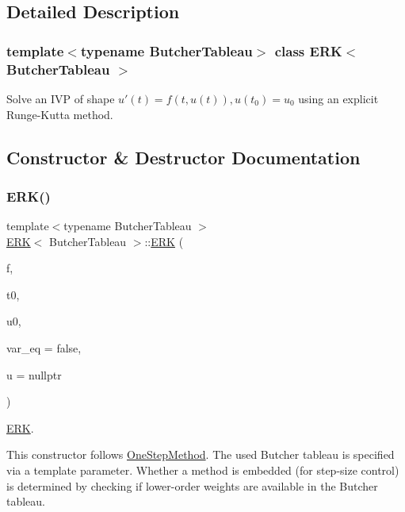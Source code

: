 \subsection{Detailed Description}
\subsubsection*{template$<$typename Butcher\+Tableau$>$\newline
class E\+R\+K$<$ Butcher\+Tableau $>$}

Solve an I\+VP of shape $u'(t) = f(t, u(t)), u(t_0) = u_0$ using an explicit Runge-\/\+Kutta method. 

\subsection{Constructor \& Destructor Documentation}
\mbox{\label{classERK_a354218adfe6be3dd211d263524cdda94}} 
\subsubsection{\texorpdfstring{E\+R\+K()}{ERK()}}
{\footnotesize\ttfamily template$<$typename Butcher\+Tableau $>$ \\
\hyperlink{classERK}{E\+RK}$<$ Butcher\+Tableau $>$\+::\hyperlink{classERK}{E\+RK} (\begin{DoxyParamCaption}\item[{\hyperlink{classTimeFunctor}{Time\+Functor} \&}]{f,  }\item[{F\+P\+\_\+\+Type}]{t0,  }\item[{Vector\+D2}]{u0,  }\item[{bool}]{var\+\_\+eq = {\ttfamily false},  }\item[{\hyperlink{classCurve}{Curve} $\ast$}]{u = {\ttfamily nullptr} }\end{DoxyParamCaption})\hspace{0.3cm}{\ttfamily [inline]}}



\hyperlink{classERK}{E\+RK}. 

This constructor follows {\ttfamily \hyperlink{classOneStepMethod}{One\+Step\+Method}}. The used Butcher tableau is specified via a template parameter. Whether a method is embedded (for step-\/size control) is determined by checking if lower-\/order weights are available in the Butcher tableau.

